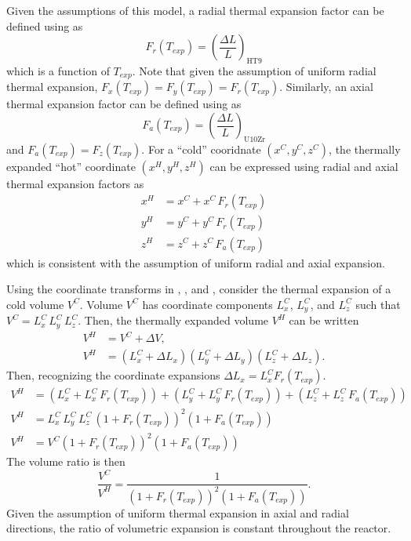   Given the assumptions of this model, a radial thermal expansion factor can be
  defined using  as
  \begin{equation}
    \label{eq:lef_r}
    F_r(T_{exp}) = \left(\frac{\Delta L}{L}\right)_{\text{HT9}}
  \end{equation}
  which is a function of $T_{exp}$. Note that given the assumption of uniform
  radial thermal expansion, ${F_x(T_{exp}) = F_y(T_{exp}) = F_r(T_{exp})}$.
  Similarly, an axial thermal expansion factor can be defined using
   as 
  \begin{equation}
    \label{eq:lef_a}
    F_a(T_{exp}) = \left(\frac{\Delta L}{L}\right)_{\text{U10Zr}}
  \end{equation}
  and $F_a(T_{exp}) = F_z(T_{exp})$. For a ``cold'' cooridnate $(x^C,y^C,z^C)$,
  the thermally expanded ``hot'' coordinate $(x^H,y^H,z^H)$ can be expressed 
  using radial and axial thermal expansion factors as
  \begin{align}
    \label{eq:expand_x}
    x^H &= x^C + x^C \, F_r(T_{exp}) \\
    \label{eq:expand_y}
    y^H &= y^C + y^C \, F_r(T_{exp}) \\
    \label{eq:expand_z}
    z^H &= z^C + z^C \, F_a(T_{exp})
  \end{align}
  which is consistent with the assumption of uniform radial and axial expansion.

  Using the coordinate transforms in , , and
  , consider the thermal expansion of a cold volume $V^C$.
  Volume $V^C$ has coordinate components $L_x^C$, $L_y^C$, and $L_z^C$ such that 
  ${V^C = L_x^C \, L_y^C \, L_z^C}$. Then, the thermally expanded volume $V^H$ 
  can be written
  \begin{align}
    V^H &= V^C + \Delta V, \\
    V^H &= (L_x^C + \Delta L_x) (L_y^C + \Delta L_y) (L_z^C + \Delta L_z). 
  \end{align}
  Then, recognizing the coordinate expansions 
  ${\Delta L_x = L_x^C F_r(T_{exp})}$.
  \begin{align}
    V^H &= (L_x^C + L_x^C \, F_r(T_{exp})) + (L_y^C + L_y^C \, F_r(T_{exp})) + 
      (L_z^C + L_z^C \, F_a(T_{exp})) \\
    V^H &= L_x^C \, L_y^C \, L_z^C \, (1 + F_r(T_{exp}))^2 (1+F_a(T_{exp})) \\
    V^H &= V^C (1 + F_r(T_{exp}))^2 (1+F_a(T_{exp}))
  \end{align}
  The volume ratio is then
  \begin{equation}
    \label{eq:volume_ratio}
    \frac{V^C}{V^H} = \frac{1}{(1+F_r(T_{exp}))^2 (1+F_a(T_{exp}))}.
  \end{equation}
  Given the assumption of uniform thermal expansion in axial and radial
  directions, the ratio of volumetric expansion is constant throughout the
  reactor.


